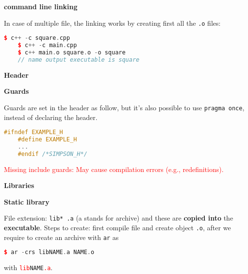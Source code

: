 \documentclass[fontsize=8pt, a4paper, landscape, fleqn]{scrartcl}
\renewcommand{\section}[1]{%
    \noindent\colorbox{sectioncolor}{%
        \parbox{\dimexpr\columnwidth-2\fboxsep}{\color{white}\textbf{#1}}}%
    \vspace{0.5mm}%
}
\renewcommand{\subsection}[1]{%
    \noindent\colorbox{subsectioncolor}{%
        \parbox{\dimexpr\columnwidth-2\fboxsep}{\color{white}\textbf{#1}}}%
    \vspace{0.5mm}%
}
\begin{document}
\begin{multicols*}{3}[\raggedcolumns]
	\subsection{command line linking}
    In case of multiple file, the linking works by creating first all the \lstinline{.o} files:

    \begin{lstlisting}[language=C++, breaklines]
    $ c++ -c square.cpp
    $ c++ -c main.cpp
    $ c++ main.o square.o -o square
    // name output executable is square \end{lstlisting}

    \section{Header}
    \subsection{Guards}
    Guards are set in the header as follow, but it's also possible to use \lstinline{pragma once}, instead of declaring the header.
    \begin{lstlisting}[language=C++, breaklines]
    #ifndef EXAMPLE_H 
    #define EXAMPLE_H
    ...
    #endif /*SIMPSON_H*/ \end{lstlisting}
    \textcolor{red}{Missing include guards: May cause compilation errors (e.g., redefinitions).}\\
    \section{Libraries}
    \subsection{Static library} 
    File extension: \lstinline{lib* .a} (a stands for archive) and these are \textbf{copied into} the \textbf{executable}.
    Steps to create: first compile file and create object \lstinline{.o}, after we require to create an archive with \lstinline{ar} as

    \begin{lstlisting}[language=C++, breaklines]
    $ ar -crs libNAME.a NAME.o \end{lstlisting}

    with \textcolor{red}{\lstinline{lib}}\lstinline{NAME}\textcolor{red}{\lstinline{.a}}.
        

\end{multicols*}
\end{document}
